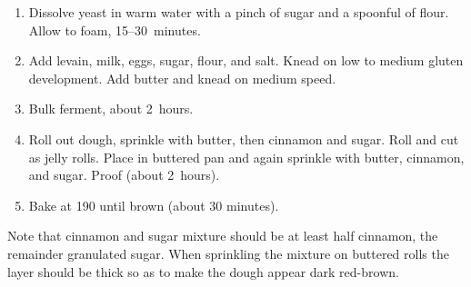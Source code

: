 
\begin{ingredients}
\end{ingredients}


\begin{recipe}
  \begin{enumerate}
  \item Dissolve yeast in warm water with a pinch of sugar and a
    spoonful of flour.  Allow to foam, 15--30~minutes.

  \item Add levain, milk, eggs, sugar, flour, and salt.  Knead on low
    to medium gluten development.  Add butter and knead on medium
    speed.

  \item Bulk ferment, about 2~hours.

  \item Roll out dough, sprinkle with butter, then cinnamon and sugar.
    Roll and cut as jelly rolls. Place in buttered pan and again sprinkle
    with butter, cinnamon, and sugar.  Proof (about 2~hours).

  \item Bake at 190\degreeC{} until brown (about 30 minutes).

  \end{enumerate}

  Note that cinnamon and sugar mixture should be at least half
  cinnamon, the remainder granulated sugar.  When sprinkling the
  mixture on buttered rolls the layer should be thick so as to make
  the dough appear dark red-brown.
\end{recipe}
